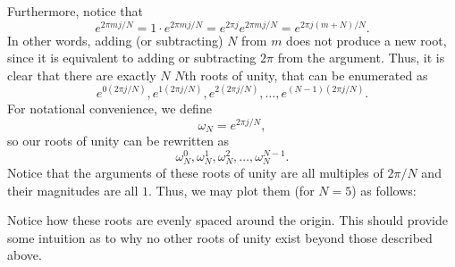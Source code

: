 \documentclass[letterpaper]{article}
\theoremstyle{remark}
\begin{document}
Furthermore, notice that
\[
    e^{2\pi m j / N} = 1 \cdot e^{2\pi m j / N} = e^{2\pi j} e^{2\pi m j / N} = e^{2\pi j (m + N) / N}.
\]
In other words, adding (or subtracting) $N$ from $m$ does not produce a new root, since it is equivalent to adding or subtracting $2\pi$ from the argument. Thus, it is clear that there are exactly $N$ $N$th roots of unity, that can be enumerated as
\[
    e^{0(2\pi j / N)}, e^{1(2\pi j / N)}, e^{2(2\pi j/ N)}, \ldots, e^{(N - 1)(2 \pi j / N)}.
\]
For notational convenience, we define
\[
    \omega_N = e^{2\pi j / N},
\]
so our roots of unity can be rewritten as
\[
    \omega_N^0, \omega_N^1, \omega_N^2, \ldots, \omega_N^{N-1}.
\]
Notice that the arguments of these roots of unity are all multiples of $2\pi / N$ and their magnitudes are all $1$. Thus, we may plot them (for $N = 5$) as follows:
\begin{center}
\end{center}
Notice how these roots are evenly spaced around the origin. This should provide some intuition as to why no other roots of unity exist beyond those described above.
\end{document}
